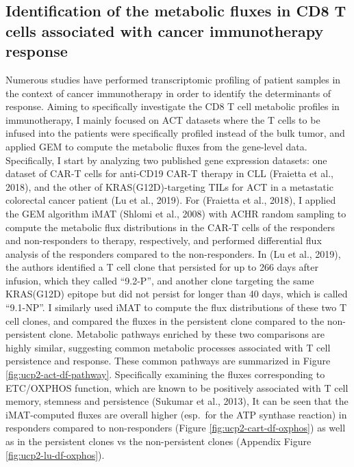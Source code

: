 \documentclass[12pt,twoside,openany,\mydriver]{thesis}  %
\begin{document}
\hypertarget{identification-of-the-metabolic-fluxes-in-cd8-t-cells-associated-with-cancer-immunotherapy-response}{%
\subsection{Identification of the metabolic fluxes in CD8 T cells associated with cancer immunotherapy response}\label{identification-of-the-metabolic-fluxes-in-cd8-t-cells-associated-with-cancer-immunotherapy-response}}

Numerous studies have performed transcriptomic profiling of patient samples in the context of cancer immunotherapy in order to identify the determinants of response. Aiming to specifically investigate the CD8 T cell metabolic profiles in immunotherapy, I mainly focused on ACT datasets where the T cells to be infused into the patients were specifically profiled instead of the bulk tumor, and applied GEM to compute the metabolic fluxes from the gene-level data. Specifically, I start by analyzing two published gene expression datasets: one dataset of CAR-T cells for anti-CD19 CAR-T therapy in CLL (Fraietta et al., 2018), and the other of KRAS(G12D)-targeting TILs for ACT in a metastatic colorectal cancer patient (Lu et al., 2019). For (Fraietta et al., 2018), I applied the GEM algorithm iMAT (Shlomi et al., 2008) with ACHR random sampling to compute the metabolic flux distributions in the CAR-T cells of the responders and non-responders to therapy, respectively, and performed differential flux analysis of the responders compared to the non-responders. In (Lu et al., 2019), the authors identified a T cell clone that persisted for up to 266 days after infusion, which they called ``9.2-P'', and another clone targeting the same KRAS(G12D) epitope but did not persist for longer than 40 days, which is called ``9.1-NP''. I similarly used iMAT to compute the flux distributions of these two T cell clones, and compared the fluxes in the persistent clone compared to the non-persistent clone. Metabolic pathways enriched by these two comparisons are highly similar, suggesting common metabolic processes associated with T cell persistence and response. These common pathways are summarized in Figure \ref{fig:ucp2-act-df-pathway}. Specifically examining the fluxes corresponding to ETC/OXPHOS function, which are known to be positively associated with T cell memory, stemness and persistence (Sukumar et al., 2013), It can be seen that the iMAT-computed fluxes are overall higher (esp.~for the ATP synthase reaction) in responders compared to non-responders (Figure \ref{fig:ucp2-cart-df-oxphos}) as well as in the persistent clones vs the non-persistent clones (Appendix Figure \ref{fig:ucp2-lu-df-oxphos}).
\end{document}
